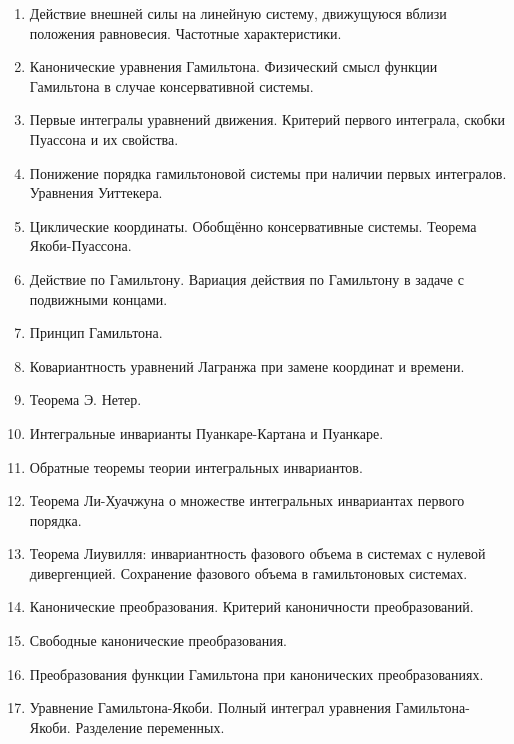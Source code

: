\documentclass[a4paper,12pt]{article}
\begin{document}
\begin{enumerate}
	\item Действие внешней силы на линейную систему, движущуюся вблизи положения равновесия. Частотные характеристики.
	
	\item Канонические  уравнения  Гамильтона.  Физический смысл функции Гамильтона в случае консервативной системы.
	
	\item Первые интегралы уравнений движения. Критерий первого интеграла, скобки Пуассона и их свойства.
	
	
	\item Понижение порядка гамильтоновой системы при наличии первых интегралов. Уравнения Уиттекера.
	
	\item Циклические координаты. Обобщённо консервативные системы. Теорема Якоби-Пуассона.
	
	\item Действие по Гамильтону. Вариация  действия по Гамильтону в задаче с подвижными концами.
	
	
	\item Принцип Гамильтона.
	
	\item Ковариантность уравнений Лагранжа при замене координат и времени.
	
	\item Теорема Э. Нетер.
	
	\item Интегральные  инварианты Пуанкаре-Картана и Пуанкаре.
	
	\item Обратные  теоремы  теории  интегральных  инвариантов.
	
	\item Теорема Ли-Хуачжуна о множестве интегральных инвариантах первого порядка.
	
	\item Теорема Лиувилля: инвариантность фазового объема в системах с нулевой дивергенцией. Сохранение фазового объема в гамильтоновых системах.
	
	\item Канонические преобразования. Критерий каноничности преобразований.
	
	\item Свободные канонические преобразования.
	
	\item Преобразования функции Гамильтона при канонических преобразованиях.
	
	\item Уравнение Гамильтона-Якоби. Полный интеграл уравнения Гамильтона-Якоби. Разделение переменных.
\end{enumerate}
\end{document}
